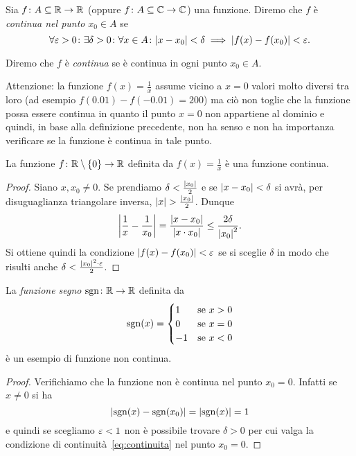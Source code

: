 \begin{definition}
  \label{def:continua}%
  Sia $f\colon A \subseteq {\mathbb R} \to {\mathbb R}$ 
  (oppure $f\colon A\subseteq {\mathbb C} \to {\mathbb C}$) una funzione. 
  Diremo che $f$ è \emph{continua nel punto}%
%
 $x_0\in A$ se
  \begin{equation}\label{eq:continuita}
  \forall \varepsilon>0 \colon \exists \delta>0 \colon
  \forall x\in A\colon
  {\left|x-x_0\right|} < \delta \implies {\left|f(x)-f(x_0)\right|} < \varepsilon.
  \end{equation}
  
  Diremo che $f$ è \emph{continua}%
%
 se è continua in ogni punto $x_0 \in A$.
  \end{definition}
  
  
  Attenzione: la funzione $f(x)=\frac{1}{x}$
  assume vicino a $x=0$ valori molto diversi tra loro (ad esempio $f(0.01)-f(-0.01)=200$)
  ma ciò non toglie che la funzione possa essere continua in quanto il punto
  $x=0$ non appartiene al dominio e quindi,
  in base alla definizione precedente, non ha senso e non ha importanza
  verificare se la funzione è continua in tale punto.
  
  \begin{theorem}
  \label{th:cont_reciproco}%
  La funzione $f\colon {\mathbb R}\setminus{\left\{ 0 \right\}}\to {\mathbb R}$ definita
  da $f(x)=\frac 1 x$ è una funzione continua.
  \end{theorem}
  \begin{proof}
  Siano $x,x_0\neq 0$.
  Se prendiamo $\delta < \frac{{\left|x_0\right|}}2$
  e se ${\left|x-x_0\right|} < \delta$ si avrà,
  per disuguaglianza triangolare inversa,
  ${\left|x\right|} > \frac{{\left|x_0\right|}}2$. Dunque
  \[
  {\left|\frac 1 x - \frac 1 {x_0}\right|}
  = \frac{{\left|x-x_0\right|}}{{\left|x\cdot x_0\right|}}
  \le \frac{2\delta}{{\left|x_0\right|}^2}.
  \]
  Si ottiene quindi la condizione ${\left|f(x)-f(x_0)\right|}<\varepsilon$
  se si sceglie $\delta$ in modo che
  risulti anche $\delta < \frac{{\left|x_0\right|}^2\cdot \varepsilon}{2}$.
  \end{proof}
  
  \begin{example}
  La \emph{funzione segno}%
%
 $\operatorname{sgn}\colon {\mathbb R} \to {\mathbb R}$ definita da
  \[
    \operatorname{sgn}(x) = \begin{cases}
    1 & \text{se $x> 0$}\\
    0 & \text{se $x=0$}\\
    -1 & \text{se $x<0$}
    \end{cases}
  \]
  è un esempio di funzione non continua.
  \end{example}
  \begin{proof}
  Verifichiamo che la funzione non è continua
  nel punto $x_0=0$.
  Infatti se $x\neq 0$ si ha
  \[
  {\left|\operatorname{sgn}(x)-\operatorname{sgn}(x_0)\right|} = {\left|\operatorname{sgn}(x)\right|} = 1
  \]
  e quindi se scegliamo $\varepsilon<1$ non è possibile
  trovare $\delta>0$ per cui valga la condizione
  di continuità~\eqref{eq:continuita}
  nel punto $x_0=0$.
  \end{proof}
  
